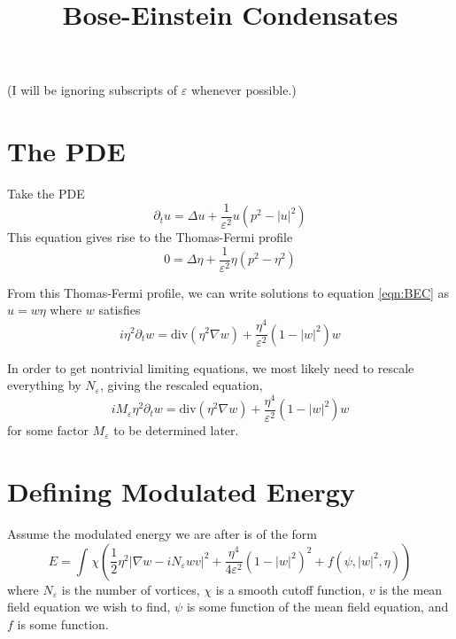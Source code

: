 \documentclass[a4paper]{article}
\title{Bose-Einstein Condensates }
\date{}
\author{}
\renewcommand{\div}{\mathrm{div}}
\begin{document}
\maketitle

(I will be ignoring subscripts of $\varepsilon$ whenever possible.)

\section{The PDE}
Take the PDE
\begin{equation} \label{eqn:BEC}
  \partial_t u = \Delta u + \frac{1}{\varepsilon^2}u (p^2 - |u|^2)
\end{equation}
This equation gives rise to the Thomas-Fermi profile
\begin{equation} \label{eqn:TF}
  0 = \Delta \eta + \frac{1}{\varepsilon^2} \eta( p^2 - \eta^2 )
\end{equation}

From this Thomas-Fermi profile, we can write solutions to equation \eqref{eqn:BEC} as $u = w \eta$ where $w$ satisfies
\begin{equation} \label{eqn:w}
  i \eta^2 \partial_t w = \div (\eta^2 \nabla w) + \frac{\eta^4}{\varepsilon^2} (1-|w|^2)w
\end{equation}

In order to get nontrivial limiting equations, we most likely need to rescale everything by $N_\varepsilon$, giving the rescaled equation,
\begin{equation}
  i M_\varepsilon \eta^2 \partial_t w = \div (\eta^2 \nabla w) + \frac{\eta^4}{\varepsilon^2} (1-|w|^2)w
  \label{eqn:rescaled_w}
\end{equation}
for some factor $M_\varepsilon$ to be determined later.

\section{Defining Modulated Energy}
Assume the modulated energy we are after is of the form
\begin{equation} \label{eqn:energy_form_primitive}
  E = \int_{}^{} \chi \left( \frac{1}{2} \eta^2 |\nabla w - i N_\varepsilon w v|^2 + \frac{\eta^4}{4 \varepsilon^2} ( 1 - |w|^2)^2 + f(\psi, |w|^2, \eta)  \right)
\end{equation}
where $N_\varepsilon$ is the number of vortices, $\chi$ is a smooth cutoff function, $v$ is the mean field equation we wish to find, $\psi$ is some
function of the mean field equation, and $f$ is some function.
\end{document}
